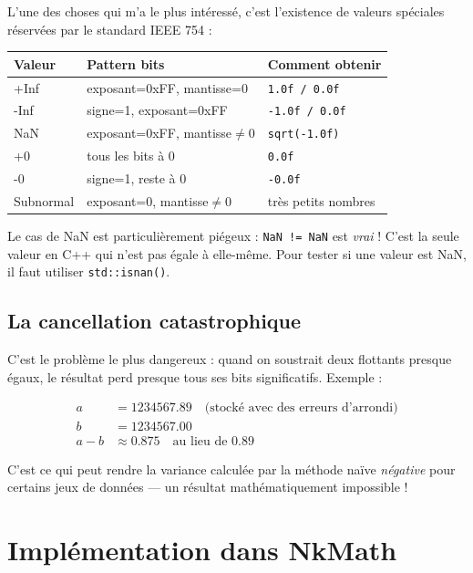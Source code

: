 \documentclass[12pt,a4paper]{report}
\newcommand{\code}[1]{\texttt{\textcolor{myblue}{#1}}}
\begin{document}
L'une des choses qui m'a le plus intéressé, c'est l'existence de valeurs spéciales réservées par le standard IEEE 754 :

\begin{center}
\begin{tabular}{lll}
\toprule
\textbf{Valeur} & \textbf{Pattern bits} & \textbf{Comment obtenir} \\
\midrule
+Inf    & exposant=0xFF, mantisse=0 & \code{1.0f / 0.0f} \\
-Inf    & signe=1, exposant=0xFF    & \code{-1.0f / 0.0f} \\
NaN     & exposant=0xFF, mantisse$\neq$0 & \code{sqrt(-1.0f)} \\
+0      & tous les bits à 0          & \code{0.0f} \\
-0      & signe=1, reste à 0        & \code{-0.0f} \\
Subnormal & exposant=0, mantisse$\neq$0 & très petits nombres \\
\bottomrule
\end{tabular}
\end{center}

Le cas de NaN est particulièrement piégeux : \code{NaN != NaN} est \textit{vrai} ! C'est la seule valeur en C++ qui n'est pas égale à elle-même. Pour tester si une valeur est NaN, il faut utiliser \code{std::isnan()}.

\subsection{La cancellation catastrophique}

C'est le problème le plus dangereux : quand on soustrait deux flottants presque égaux, le résultat perd presque tous ses bits significatifs. Exemple :

\begin{align*}
a &= 1234567.89 \quad \text{(stocké avec des erreurs d'arrondi)} \\
b &= 1234567.00 \\
a - b &\approx 0.875 \quad \text{au lieu de 0.89}
\end{align*}

C'est ce qui peut rendre la variance calculée par la méthode naïve \textit{négative} pour certains jeux de données — un résultat mathématiquement impossible !

\section{Implémentation dans NkMath}
\end{document}
